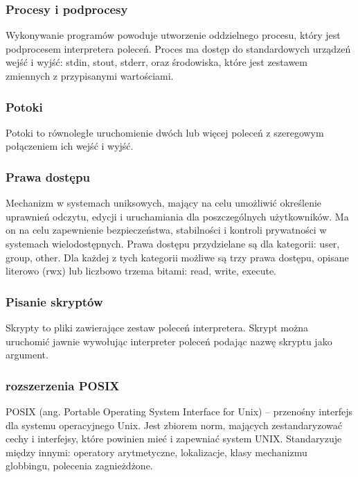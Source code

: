 \documentclass[a4paper,twoside]{report}
\begin{document}
\subsubsection{Procesy i podprocesy\\}
Wykonywanie programów powoduje utworzenie oddzielnego procesu, który jest podprocesem interpretera poleceń. Proces ma dostęp do standardowych urządzeń wejść i wyjść: stdin, stout, stderr, oraz środowiska, które jest zestawem zmiennych z przypisanymi wartościami.

\subsubsection{Potoki\\}
Potoki to równoległe uruchomienie dwóch lub więcej poleceń z szeregowym połączeniem ich wejść i wyjść.

\subsubsection{Prawa dostępu\\}

Mechanizm w systemach uniksowych, mający na celu umożliwić określenie uprawnień odczytu, edycji i uruchamiania dla poszczególnych użytkowników. Ma on na celu zapewnienie bezpieczeństwa, stabilności i kontroli prywatności w systemach wielodostępnych.
Prawa dostępu przydzielane są dla kategorii: user,    group,  other.
Dla każdej z tych kategorii możliwe są trzy prawa dostępu, opisane literowo (rwx) lub liczbowo trzema bitami: read, write, execute. 


\subsubsection{Pisanie skryptów}

Skrypty to pliki zawierające zestaw poleceń interpretera. Skrypt można uruchomić jawnie wywołując interpreter poleceń podając nazwę skryptu jako argument.


\subsubsection{rozszerzenia POSIX}


POSIX (ang. Portable Operating System Interface for Unix) – przenośny interfejs dla systemu operacyjnego Unix. Jest zbiorem norm, mających zestandaryzować cechy i interfejsy, które powinien mieć i zapewniać system UNIX. 
Standaryzuje między innymi: operatory arytmetyczne, lokalizacje, klasy mechanizmu globbingu, polecenia zagnieżdżone.
\end{document}

